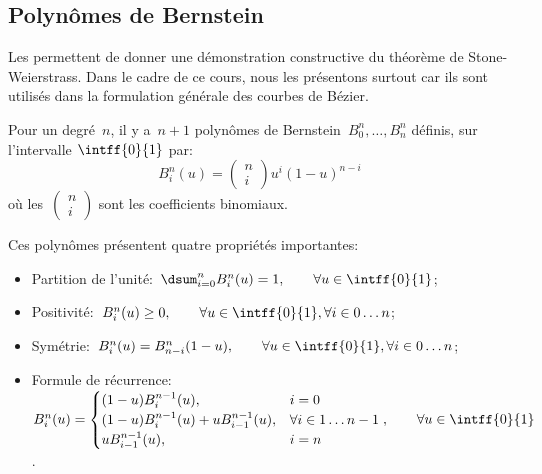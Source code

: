 \medskip
\subsection{Polynômes de Bernstein}

Les  permettent de donner une démonstration constructive du 
théorème de Stone-Weierstrass. 
Dans le cadre de ce cours, nous les présentons surtout car ils sont utilisés dans la formulation 
générale des courbes de Bézier.

\medskip
Pour un degré~$n$, il y a~$n+1$ polynômes de Bernstein~$B^n_0, \dots, B^n_n$ définis, sur l'intervalle 
$\intff{0}{1}$ par:
\begin{equation}
  B_i^n(u) = \begin{pmatrix} n \\ i \end{pmatrix} u^i \left( 1-u \right)^{n-i}
\end{equation}
où les~$\begin{pmatrix} n \\ i \end{pmatrix}$ sont les coefficients binomiaux.

\medskip
Ces polynômes présentent quatre propriétés importantes:
\begin{itemize}
  \item Partition de l'unité:~$\dsum_{i=0}^n B_i^n(u) = 1, \qquad \forall u \in \intff{0}{1}$;
  \item Positivité:~$B_i^n(u) \geq 0, \qquad \forall u \in \intff{0}{1}, \forall i \in 0 \dots n$;
  \item Symétrie:~$B_i^n(u) = B_{n-i}^n(1-u), \qquad \forall u \in \intff{0}{1}, \forall i \in 0 \dots n$;
  \item Formule de récurrence:~$B_i^n(u) = \begin{cases} (1-u)B_i^{n-1}(u),& i 
= 0\\ (1-u)B_i^{n-1}(u) + u B_{i-1}^{n-1}(u),&\forall i \in 1 \dots n-1\\ uB_{i-1}^{n-1}(u),& i = n \end{cases} , 
\qquad \forall u \in \intff{0}{1}$.
\end{itemize}



\medskip
